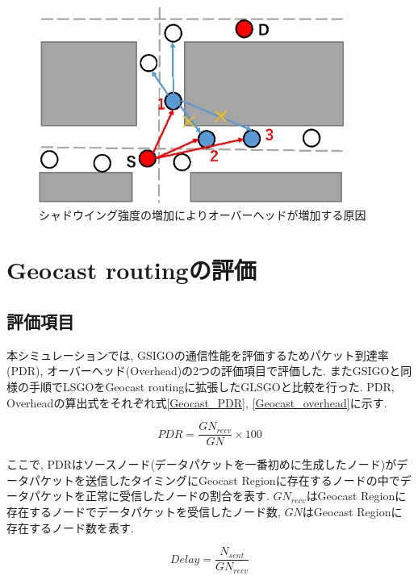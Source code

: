 \documentclass[10pt]{jreport}
\begin{document}
\begin{figure}[!ht]
	\centering
	\includegraphics[width=100mm]{figures/dif_roadsegment_overhead_reason.eps}
	\caption{シャドウイング強度の増加によりオーバーヘッドが増加する原因}
	\label{fig:dif_roadsegment_overhead_reason}
\end{figure}




\section{Geocast routingの評価}
\label{Geocast_evaluation}


\subsection{評価項目}
\label{geocast_evaluation_item}
本シミュレーションでは, GSIGOの通信性能を評価するためパケット到達率(PDR), オーバーヘッド(Overhead)の2つの評価項目で評価した. またGSIGOと同様の手順でLSGOをGeocast routingに拡張したGLSGOと比較を行った. PDR, Overheadの算出式をそれぞれ式\ref{Geocast_PDR}, \ref{Geocast_overhead}に示す.

\begin{equation}
	\label{Geocast_PDR}
	PDR = \frac{GN_{recv}}{  GN  } \times 100
\end{equation}

ここで, PDRはソースノード(データパケットを一番初めに生成したノード)がデータパケットを送信したタイミングにGeocast Regionに存在するノードの中でデータパケットを正常に受信したノードの割合を表す. $GN_{recv}$はGeocast Regionに存在するノードでデータパケットを受信したノード数, $GN$はGeocast Regionに存在するノード数を表す. 

\begin{equation}
	\label{Geocast_overhead}
	Delay =  \frac{  N_{sent}  }{GN_{recv}}
\end{equation}
\end{document}
